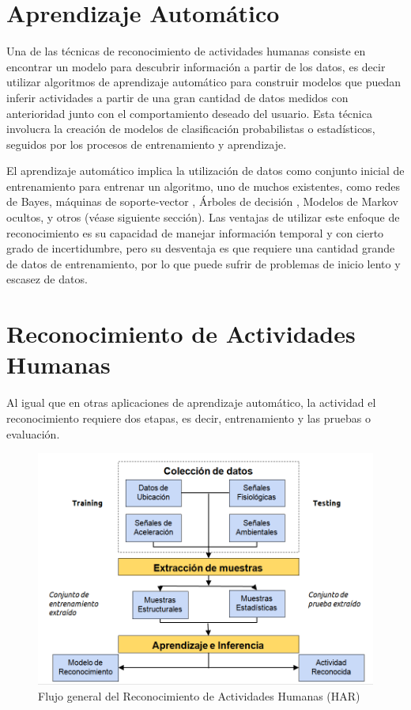 \section{Aprendizaje Automático}

\label{sec25:aprendizaje-automatico}Una de las técnicas de reconocimiento
de actividades humanas consiste en encontrar un modelo para descubrir
información a partir de los datos, es decir utilizar algoritmos de
aprendizaje automático para construir modelos que puedan inferir actividades
a partir de una gran cantidad de datos medidos con anterioridad junto
con el comportamiento deseado del usuario\cite{Chen2012}. Esta técnica
involucra la creación de modelos de clasificación probabilistas o
estadísticos, seguidos por los procesos de entrenamiento y aprendizaje.

El aprendizaje automático implica la utilización de datos como conjunto
inicial de entrenamiento para entrenar un algoritmo, uno de muchos
existentes, como redes de Bayes, máquinas de soporte-vector ,
Árboles de decisión , Modelos de Markov ocultos,
y otros \cite{Rajaraman2011} (véase siguiente sección). Las ventajas
de utilizar este enfoque de reconocimiento es su capacidad de manejar
información temporal y con cierto grado de incertidumbre, pero su
desventaja es que requiere una cantidad grande de datos de entrenamiento,
por lo que puede sufrir de problemas de inicio lento y escasez de
datos.

\section{Reconocimiento de Actividades Humanas}

\label{sec25:metodologia-har} Al igual que en otras aplicaciones
de aprendizaje automático, la actividad el reconocimiento requiere
dos etapas, es decir, entrenamiento y las pruebas o evaluación.

\begin{figure}[!htbp]
\centering \includegraphics[width=0.7\linewidth]{capitulo-2/graphics/harsystem}
\caption[Flujo HAR]{Flujo general del Reconocimiento de Actividades Humanas (HAR)}
\label{fig:harsystem} 
\end{figure}

